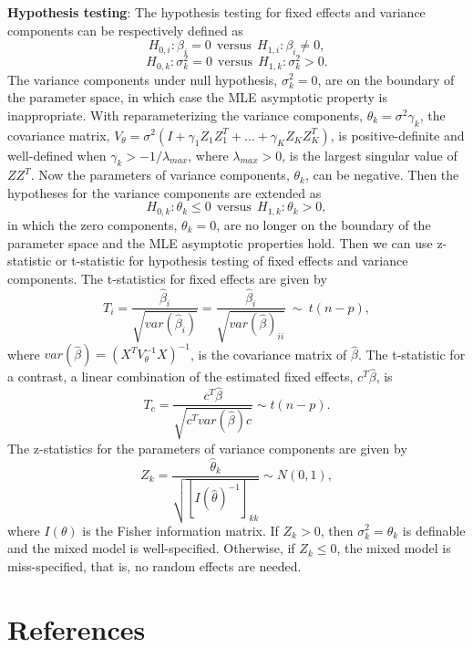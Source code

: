 \documentclass[
]{article}
\begin{document}
\textbf{Hypothesis testing}: The hypothesis testing for fixed effects
and variance components can be respectively defined as \[
H_{0, i}: \beta_i = 0 ~~\text{versus}~~H_{1,i}: \beta_i\ne 0,
\] \[
H_{0, k}: \sigma^2_k = 0 ~~\text{versus}~~H_{1,k}: \sigma^2_k > 0.
\] The variance components under null hypothesis, \(\sigma^2_k=0\), are
on the boundary of the parameter space, in which case the MLE asymptotic
property is inappropriate. With reparameterizing the variance
components, \(\theta_k = \sigma^2\gamma_k\), the covariance matrix,
\(V_{\theta} = \sigma^2(I + \gamma_1Z_1Z_1^T + \ldots + \gamma_KZ_KZ_K^T)\),
is positive-definite and well-defined when
\(\gamma_k > - 1/\lambda_{max}\), where \(\lambda_{max} > 0\), is the
largest singular value of \(ZZ^T\). Now the parameters of variance
components, \(\theta_k\), can be negative. Then the hypotheses for the
variance components are extended as \[
H_{0, k}: \theta_k \le 0 ~~\text{versus}~~H_{1,k}: \theta_k > 0,
\] in which the zero components, \(\theta_k=0\), are no longer on the
boundary of the parameter space and the MLE asymptotic properties hold.
Then we can use z-statistic or t-statistic for hypothesis testing of
fixed effects and variance components. The t-statistics for fixed
effects are given by \begin{equation}\label{tcoef}
T_i = \frac{\hat\beta_i}{\sqrt{var(\hat\beta_i)}} = \frac{\hat\beta_i}{\sqrt{var(\hat\beta)_{ii}}} ~\sim ~t(n - p),
\end{equation} where \(var(\hat\beta) = (X^TV_{\theta}^{-1}X)^{-1}\), is
the covariance matrix of \(\hat\beta\). The t-statistic for a contrast,
a linear combination of the estimated fixed effects, \(c^T\hat\beta\),
is \begin{equation}\label{tcontrast}
T_c = \frac{c^T\hat\beta}{\sqrt{c^Tvar(\hat\beta) c}} \sim t(n-p).
\end{equation} The z-statistics for the parameters of variance
components are given by \begin{equation}\label{zvarcomp}
Z_k = \frac{\hat\theta_k}{\sqrt{[I(\hat\theta)^{-1}]_{kk}}} \sim N(0, 1),
\end{equation} where \(I(\theta)\) is the Fisher information matrix. If
\(Z_k > 0\), then \(\sigma_k^2 = \theta_k\) is definable and the mixed
model is well-specified. Otherwise, if \(Z_k \le 0\), the mixed model is
miss-specified, that is, no random effects are needed.

\hypertarget{references}{%
\section*{References}\label{references}}
\end{document}
